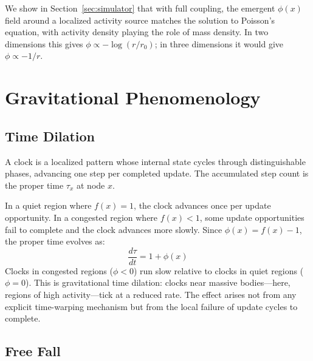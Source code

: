 \documentclass[aps, pra, reprint, superscriptaddress, nofootinbib, singlespacing]{revtex4-2}
\begin{document}
We show in Section~\ref{sec:simulator} that with full coupling, the emergent $\phi(x)$ field around a localized activity source matches the solution to Poisson's equation, with activity density playing the role of mass density. In two dimensions this gives $\phi \propto -\log(r/r_0)$; in three dimensions it would give $\phi \propto -1/r$.

\section{Gravitational Phenomenology}
\label{sec:phenomenology}

\subsection{Time Dilation}
\label{subsec:time_dilation}

A clock is a localized pattern whose internal state cycles through distinguishable phases, advancing one step per completed update. The accumulated step count is the proper time $\tau_x$ at node $x$.

In a quiet region where $f(x) = 1$, the clock advances once per update opportunity. In a congested region where $f(x) < 1$, some update opportunities fail to complete and the clock advances more slowly. Since $\phi(x) = f(x) - 1$, the proper time evolves as:
\begin{equation}
    \frac{d\tau}{dt} = 1 + \phi(x)
    \label{eq:time-dilation}
\end{equation}
Clocks in congested regions ($\phi < 0$) run slow relative to clocks in quiet regions ($\phi = 0$). This is gravitational time dilation: clocks near massive bodies—here, regions of high activity—tick at a reduced rate. The effect arises not from any explicit time-warping mechanism but from the local failure of update cycles to complete.

\subsection{Free Fall}
\label{subsec:free_fall}
\end{document}
